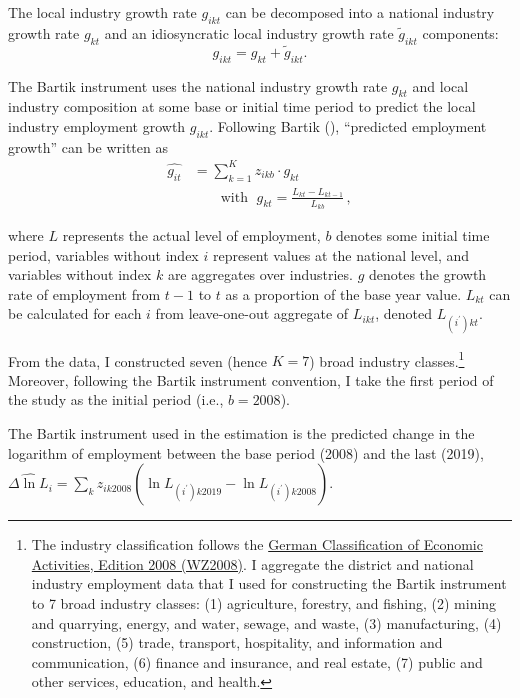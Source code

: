 \documentclass[
  12pt,
]{article}
\begin{document}
The local industry growth rate \(g_{ikt}\) can be decomposed into a national industry growth rate \(g_{kt}\) and an idiosyncratic local industry growth rate \(\widetilde{g}_{ikt}\) components: \[g_{ikt} = g_{kt} + \widetilde{g}_{ikt}.\]

The Bartik instrument uses the national industry growth rate \(g_{kt}\) and local industry composition at some base or initial time period to predict the local industry employment growth \(g_{ikt}\). Following Bartik (), ``predicted employment growth'' can be written as \[
\begin{aligned}
\widehat{g_{it}} &=\sum_{k=1}^K z_{ikb}\cdot g_{kt}\\
&\quad\quad\text{with }\;g_{kt} = \frac{L_{kt} - L_{kt-1}}{L_{kb}}\,,
\end{aligned}
\]

where \(L\) represents the actual level of employment, \(b\) denotes some initial time period, variables without index \(i\) represent values at the national level, and variables without index \(k\) are aggregates over industries. \(g\) denotes the growth rate of employment from \(t-1\) to \(t\) as a proportion of the base year value. \(L_{kt}\) can be calculated for each \(i\) from leave-one-out aggregate of \(L_{ikt}\), denoted \(L_{(i^\prime)kt}\).

From the data, I constructed seven (hence \(K=7\)) broad industry classes.\footnote{The industry classification follows the \href{https://www.destatis.de/DE/Methoden/Klassifikationen/Gueter-Wirtschaftsklassifikationen/klassifikation-wz-2008.html}{German Classification of Economic Activities, Edition 2008 (WZ2008)}. I aggregate the district and national industry employment data that I used for constructing the Bartik instrument to 7 broad industry classes: (1) agriculture, forestry, and fishing, (2) mining and quarrying, energy, and water, sewage, and waste, (3) manufacturing, (4) construction, (5) trade, transport, hospitality, and information and communication, (6) finance and insurance, and real estate, (7) public and other services, education, and health.} Moreover, following the Bartik instrument convention, I take the first period of the study as the initial period (i.e., \(b=2008\)).

The Bartik instrument used in the estimation is the predicted change in the logarithm of employment between the base period (2008) and the last (2019), \(\widehat{\Delta\ln L_i} = \sum_k{z_{ik2008} \left(\ln L_{(i^\prime)k2019}-\ln L_{(i^\prime)k2008}\right)}\).
\end{document}
